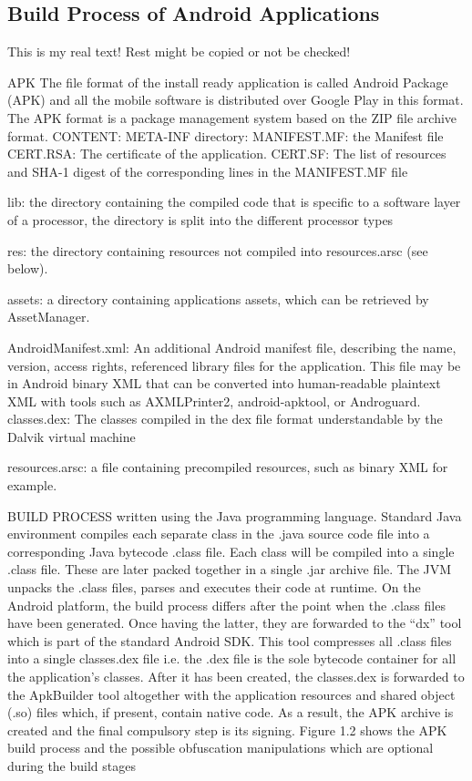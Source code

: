 \subsection{Build Process of Android Applications} \label{subsection:foundation-android-build}
This is my real text! Rest might be copied or not be checked!


%
APK
The file format of the install ready application is called Android
Package (APK) and all the mobile software is distributed over Google Play in this format. The APK format is a package management system based on the ZIP file archive format.\newline
CONTENT:
META-INF directory:
    MANIFEST.MF: the Manifest file
    CERT.RSA: The certificate of the application.
    CERT.SF: The list of resources and SHA-1 digest of the corresponding lines in the MANIFEST.MF file

lib: the directory containing the compiled code that is specific to a software layer of a processor, the directory is split into the different processor types

res: the directory containing resources not compiled into resources.arsc (see below).

assets: a directory containing applications assets, which can be retrieved by AssetManager.

AndroidManifest.xml: An additional Android manifest file, describing the name, version, access rights, referenced library files for the application. This file may be in Android binary XML that can be converted into human-readable plaintext XML with tools such as AXMLPrinter2, android-apktool, or Androguard.
classes.dex: The classes compiled in the dex file format understandable by the Dalvik virtual machine

resources.arsc: a file containing precompiled resources, such as binary XML for example.

BUILD PROCESS
written using the Java programming language.\newline
Standard Java environment compiles each separate class in the .java source code file into a corresponding Java bytecode .class file. Each class will be compiled into a single .class file. These are later packed together in a single .jar archive file. The JVM unpacks the .class files, parses and executes their code at runtime.\newline
On the Android platform, the build process differs after the point when the .class files have been generated. Once having the latter, they are forwarded to the “dx” tool which is part of the standard Android SDK. This tool compresses all .class files into a single classes.dex file i.e. the .dex file is the sole bytecode container for all the application’s classes. After it has been created, the classes.dex is forwarded to the ApkBuilder tool altogether with the application resources and shared object (.so) files which, if present, contain native code. As a result, the APK archive is created and the final compulsory step is its signing. Figure 1.2 shows the APK build process and the
possible obfuscation manipulations which are optional during the build stages\newline

